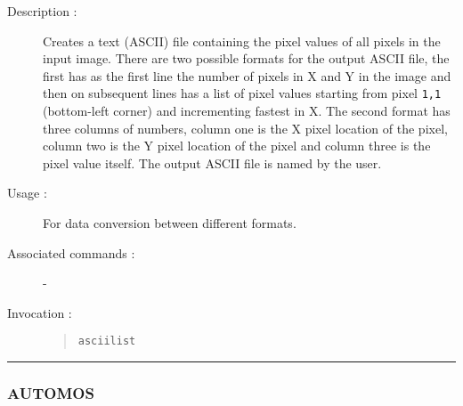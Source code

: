 \begin{description}

\item[Description :] Creates a text (ASCII) file containing the pixel
values of all pixels in the input image.  There are two possible
formats for the output ASCII file, the first has as the first line the
number of pixels in X and Y in the image and then on subsequent lines
has a list of pixel values starting from pixel {\tt 1,1} (bottom-left
corner) and incrementing fastest in X.  The second format has three
columns of numbers, column one is the X pixel location of the pixel,
column two is the Y pixel location of the pixel and column three is the
pixel value itself.  The output ASCII file is named by the user.

\item[Usage :] For data conversion between different formats.
\item[Associated commands :] -
\item[Invocation :]

\begin{quote}{\tt  asciilist }\end{quote}

\end{description}

\hrule 
\subsubsection*{\label{AUTOMOS}AUTOMOS}

